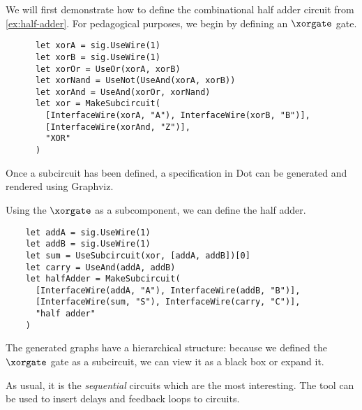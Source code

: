 \begin{example}
  We will first demonstrate how to define the combinational half adder circuit
  from \cref{ex:half-adder}.
  For pedagogical purposes, we begin by defining an \(\xorgate\) gate.
  \begin{lstlisting}
      let xorA = sig.UseWire(1)
      let xorB = sig.UseWire(1)
      let xorOr = UseOr(xorA, xorB)
      let xorNand = UseNot(UseAnd(xorA, xorB))
      let xorAnd = UseAnd(xorOr, xorNand)
      let xor = MakeSubcircuit(
        [InterfaceWire(xorA, "A"), InterfaceWire(xorB, "B")],
        [InterfaceWire(xorAnd, "Z")],
        "XOR"
      )
    \end{lstlisting}

  Once a subcircuit has been defined, a specification in Dot can be generated
  and rendered using Graphviz.

  \begin{center}
    
  \end{center}

  Using the \(\xorgate\) as a subcomponent, we can define the half adder.

  \begin{lstlisting}
    let addA = sig.UseWire(1)
    let addB = sig.UseWire(1)
    let sum = UseSubcircuit(xor, [addA, addB])[0]
    let carry = UseAnd(addA, addB)
    let halfAdder = MakeSubcircuit(
      [InterfaceWire(addA, "A"), InterfaceWire(addB, "B")],
      [InterfaceWire(sum, "S"), InterfaceWire(carry, "C")],
      "half adder"
    )
    \end{lstlisting}

  The generated graphs have a hierarchical structure: because we defined the
  \(\xorgate\) gate as a subcircuit, we can view it as a black box or
  expand it.

  \begin{center}
    

    \vspace{1em}

    
  \end{center}
\end{example}

As usual, it is the \emph{sequential} circuits which are the most interesting.
The tool can be used to insert delays and feedback loops to circuits.

